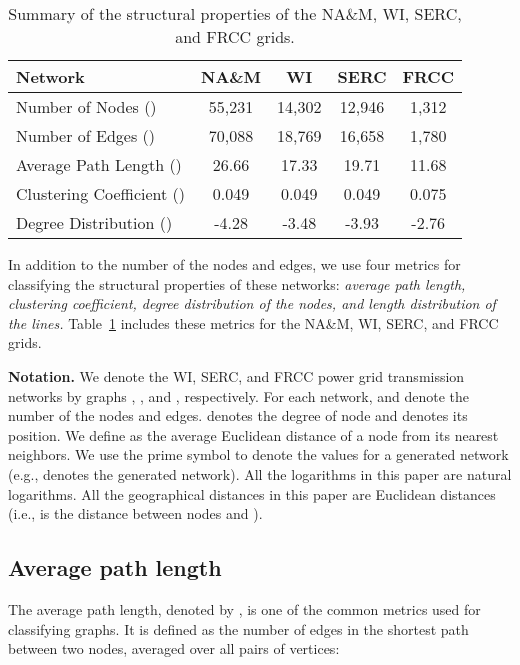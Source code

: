 \documentclass[10pt,journal]{IEEEtran}
\begin{document}
\begin{table}[t]
\begin{center}
\caption{Summary of the structural properties of the NA\&M, WI, SERC, and FRCC grids.}
\begin{tabular}{|l|c|c|c|c|}
\hline
Network&NA\&M&WI&SERC&FRCC\\
\hline
Number of Nodes ()&55,231& 14,302 &12,946 &1,312\\
\hline
Number of Edges ()&70,088 &18,769 & 16,658 & 1,780\\
\hline
Average Path Length ()&26.66 &17.33&19.71&11.68\\
\hline
Clustering Coefficient ()&0.049 &0.049&0.049&0.075\\
\hline
Degree Distribution ()&-4.28 &-3.48&-3.93&-2.76\\
\hline
\end{tabular}\label{tb:summary_struct}
\end{center}
\end{table}



In addition to the number of the nodes and edges, we use four metrics for classifying the structural properties of these networks: \emph{average path length, clustering coefficient, degree distribution of the nodes, and length distribution of the lines.} Table~\ref{tb:summary_struct} includes these metrics for the NA\&M, WI, SERC, and FRCC grids.







\noindent\textbf{Notation.} We denote the WI, SERC, and FRCC  power grid transmission networks by graphs , , and , respectively. For each network,  and  denote the number of the nodes and edges.  denotes the degree of node  and  denotes its position. We define  as the average Euclidean distance of a node from its  nearest neighbors.
We use the prime symbol  to denote the values for a generated network (e.g.,  denotes the generated network).  All the logarithms in this paper are natural logarithms. All the geographical distances in this paper are Euclidean distances (i.e.,  is the distance between nodes  and ).



\subsection{Average path length}
The average path length, denoted by , is one of the common metrics used for classifying graphs. It is defined as the number of edges in the shortest path between two nodes, averaged over all pairs of vertices:
\end{document}
